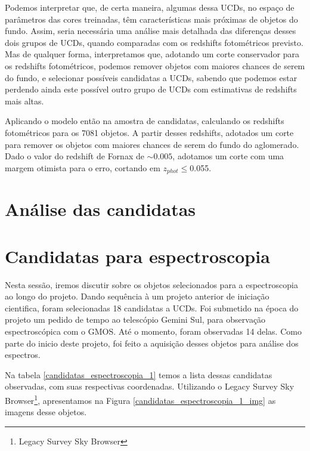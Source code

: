 Podemos interpretar que, de certa maneira, algumas dessa UCDs, no espaço de parâmetros das cores treinadas, têm características mais próximas de objetos do fundo. Assim, seria necessária uma análise mais detalhada das diferenças desses dois grupos de UCDs, quando comparadas com os redshifts fotométricos previsto. Mas de qualquer forma, interpretamos que, adotando um corte conservador para os redshifts fotométricos, podemos remover objetos com maiores chances de serem do fundo, e selecionar possíveis candidatas a UCDs, sabendo que podemos estar perdendo ainda este possível outro grupo de UCDs com estimativas de redshifts mais altas.

\vspace{\baselineskip}

Aplicando o modelo então na amostra de candidatas, calculando os redshifts fotométricos para os 7081 objetos. A partir desses redshifts, adotados um corte para remover os objetos com maiores chances de serem do fundo do aglomerado. Dado o valor do redshift de Fornax de $\sim 0.005$, adotamos um corte com uma margem otimista para o erro, cortando em \textit{$z_{phot}$}$\leq$0.055.

\section{Análise das candidatas}

\section{Candidatas para espectroscopia}
Nesta sessão, iremos discutir sobre os objetos selecionados para a espectroscopia ao longo do projeto. Dando sequência à um projeto anterior de iniciação cientifica, foram selecionadas 18 candidatas a UCDs. Foi submetido na época do projeto um pedido de tempo ao telescópio Gemini Sul, para observação espectroscópica com o GMOS. Até o momento, foram observadas 14 delas. Como parte do inicio deste projeto, foi feito a aquisição desses objetos para análise dos espectros.

\vspace{\baselineskip}

Na tabela \ref{candidatas_espectroscopia_1} temos a lista dessas candidatas observadas, com suas respectivas coordenadas. Utilizando o Legacy Survey Sky Browser\footnote{Legacy Survey Sky Browser}, apresentamos na Figura \ref{candidatas_espectroscopia_1_img} as imagens desse objetos.

